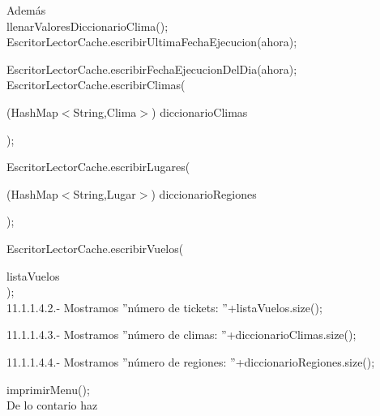 \documentclass[30pt]{article}
\theoremstyle{definition}
\begin{document}
  \hspace{4cm} Además\\
  
  \hspace{4cm} llenarValoresDiccionarioClima();\\
  
  \hspace{4cm} EscritorLectorCache.escribirUltimaFechaEjecucion(ahora);
  
  \hspace{4cm} EscritorLectorCache.escribirFechaEjecucionDelDia(ahora);\\
  
    \hspace{4cm} EscritorLectorCache.escribirClimas(
    
  \hspace{5cm} (HashMap$<$String,Clima$>$) diccionarioClimas
  
  \hspace{4cm} );
  
  \hspace{4cm} EscritorLectorCache.escribirLugares(
  
  \hspace{5cm} (HashMap$<$String,Lugar$>$) diccionarioRegiones
  
  \hspace{4cm} );
  
  \hspace{4cm} EscritorLectorCache.escribirVuelos(
  
  \hspace{5cm} listaVuelos\\
  
    \hspace{4cm} );\\
  
  \hspace{5cm} 11.1.1.4.2.- Mostramos ''número de tickets: ''+listaVuelos.size();
  
  \hspace{5cm} 11.1.1.4.3.- Mostramos ''número de climas: ''+diccionarioClimas.size();
  
  \hspace{5cm} 11.1.1.4.4.- Mostramos ''número de regiones: ''+diccionarioRegiones.size();
  
  \hspace{5cm} imprimirMenu();\\
  
  \hspace{3cm} De lo contario haz\\
  
\end{document}
